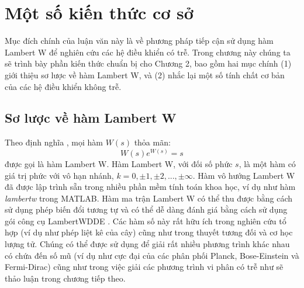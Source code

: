 
\chapter{Một số kiến thức cơ sở}

\indent Mục đích chính của luận văn này là về phương pháp tiếp cận sử dụng hàm Lambert W để nghiên cứu các hệ điều khiển có trễ. Trong chương này chúng ta sẽ trình bày phần kiến thức chuẩn bị cho Chương 2, bao gồm hai mục chính (1) giới thiệu sơ lược về hàm Lambert W, và (2) nhắc lại một số tính chất cơ bản của các hệ điều khiển không trễ.


\section{Sơ lược về hàm Lambert W}\label{sec1.1}

Theo định nghĩa \cite{Cor96,Eul77,Lam58}, mọi hàm $W(s)$ thỏa mãn:
\begin{equation}\label{2}
 W(s)e^{W(s)}=s
\end{equation}
được gọi là hàm Lambert W. Hàm Lambert W, với đối số phức $s$, là một hàm có giá trị phức với vô hạn nhánh, $k=0,\pm 1,\pm 2,...,\pm\infty$. Hàm vô hướng Lambert W đã được lập trình sẵn trong nhiều phần mềm tính toán khoa học, ví dụ như hàm \emph{lambertw} trong MATLAB. Hàm ma trận Lambert W \cite{Yi10} có thể thu được bằng cách sử dụng phép biến đổi tương tự và có thể dễ dàng đánh giá bằng cách sử dụng gói công cụ LambertWDDE \cite{Dua10}.
Các hàm số này rất hữu ích trong nghiên cứu tổ hợp (ví dụ như phép liệt kê của cây) cũng như trong thuyết tương đối và cơ học lượng tử. 
Chúng có thể được sử dụng để giải rất nhiều phương trình khác nhau có chứa đến số mũ (ví dụ như cực đại của các phân phối Planck, Bose-Einstein và Fermi-Dirac) cũng như trong việc giải các phương trình vi phân có trễ như sẽ thảo luận trong chương tiếp theo.

